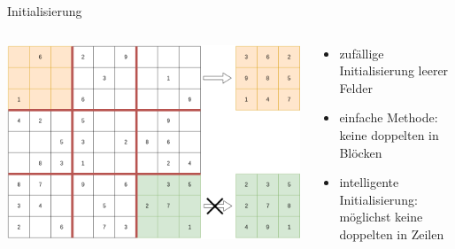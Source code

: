 \begin{frame}{Initialisierung}
    \begin{columns}[T] %
        \begin{column}{0.75\textwidth}
            \includegraphics[width=\textwidth]{Pictures/Initialisierung.png}
        \end{column}
        \begin{column}{0.35\textwidth}
            \begin{itemize}
                \item zufällige Initialisierung leerer Felder
                \item einfache Methode: keine doppelten in Blöcken
                \item intelligente Initialisierung: möglichst keine doppelten in Zeilen
            \end{itemize}
        \end{column}
    \end{columns}
\end{frame}
